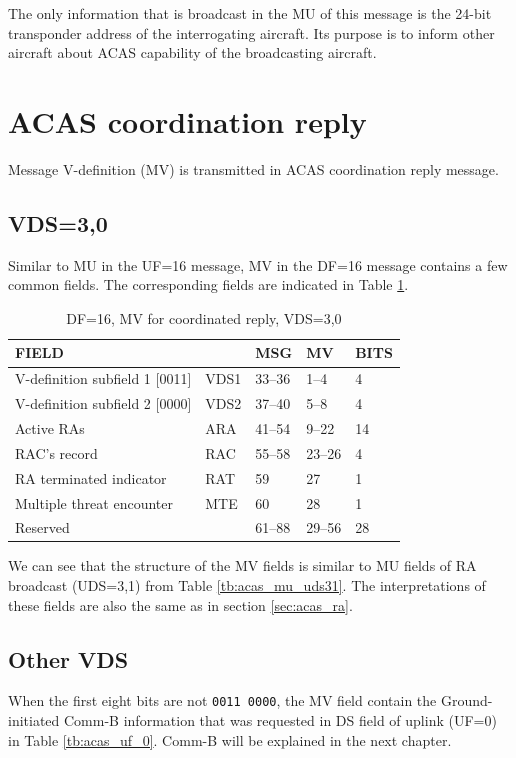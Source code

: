The only information that is broadcast in the MU of this message is the 24-bit transponder address of the interrogating aircraft. Its purpose is to inform other aircraft about ACAS capability of the broadcasting aircraft.


\section{ACAS coordination reply}

Message V-definition (MV) is transmitted in ACAS coordination reply message. 

\subsection{VDS=3,0}
Similar to MU in the UF=16 message, MV in the DF=16 message contains a few common fields. The corresponding fields are indicated in Table \ref{tb:acas_mv_vds30}.

\begin{table}[ht]
\caption{DF=16, MV for coordinated reply, VDS=3,0}
\label{tb:acas_mv_vds30}
\begin{tabular}{|l|l|l|l|l|}
\hline
\textbf{FIELD} & \textbf{} & \textbf{MSG} & \textbf{MV} & \textbf{BITS} \\ \hline
V-definition subfield 1 [0011] & VDS1 & 33--36 & 1--4 & 4 \\ \hline
V-definition subfield 2 [0000] & VDS2 & 37--40 & 5--8 & 4 \\ \hline
Active RAs & ARA & 41--54 & 9--22 & 14 \\ \hline
RAC's record & RAC & 55--58 & 23--26 & 4 \\ \hline
RA terminated indicator & RAT & 59 & 27 & 1 \\ \hline
Multiple threat encounter & MTE & 60 & 28 & 1 \\ \hline
Reserved &  & 61--88 & 29--56 & 28 \\ \hline
\end{tabular}
\end{table}

We can see that the structure of the MV fields is similar to MU fields of RA broadcast (UDS=3,1) from Table \ref{tb:acas_mu_uds31}. The interpretations of these fields are also the same as in section \ref{sec:acas_ra}.

\subsection{Other VDS}
When the first eight bits are not \texttt{0011 0000}, the MV field contain the Ground-initiated Comm-B information that was requested in DS field of uplink (UF=0) in Table \ref{tb:acas_uf_0}. Comm-B will be explained in the next chapter.

